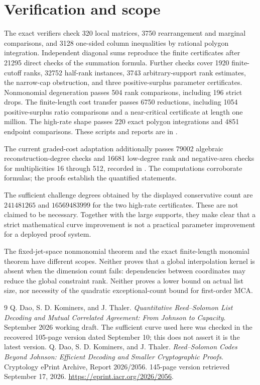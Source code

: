 \documentclass[11pt]{article}
\theoremstyle{remark}\newtheorem{remark}[theorem]{Remark}
\begin{document}
\section{Verification and scope}

The exact verifiers check 320 local matrices, 3750 rearrangement and
marginal comparisons, and 3128 one-sided column inequalities by rational
polygon integration. Independent diagonal sums reproduce the finite
certificates after 21295 direct checks of the summation formula.
Further checks cover 1920 finite-cutoff ranks, 32752 half-rank instances,
3743 arbitrary-support rank estimates, the narrow-cap obstruction,
and three positive-surplus parameter certificates. Nonmonomial
degeneration passes 504 rank comparisons, including 196 strict drops.
The finite-length cost transfer passes 6750 reductions, including 1054
positive-surplus ratio comparisons and a near-critical certificate at
length one million. The high-rate shape passes 220 exact polygon
integrations and 4851 endpoint comparisons. These scripts and reports
are in .

The current graded-cost adaptation additionally passes 79002 algebraic
reconstruction-degree checks and 16681 low-degree rank and negative-area
checks for multiplicities 16 through 512, recorded in
.
The computations corroborate formulas; the proofs establish the
quantified statements.

The sufficient challenge degrees obtained by the displayed conservative
count are $241481265$ and $16569483999$ for the two high-rate certificates.
These are not claimed to be necessary. Together with the large supports,
they make clear that a strict mathematical curve improvement is not a
practical parameter improvement for a deployed proof system.

The fixed-jet-space nonmonomial theorem and the exact finite-length
monomial theorem have different scopes. Neither proves that a global
interpolation kernel is absent when the dimension count fails:
dependencies between coordinates may reduce the global constraint rank.
Neither proves a lower bound on actual list size, nor necessity of the
quadratic exceptional-count bound for first-order MCA.

\begin{thebibliography}{9}
 Q. Dao, S. D. Kominers, and J. Thaler.
\emph{Quantitative Reed--Solomon List Decoding and Mutual Correlated
Agreement: From Johnson to Capacity}. September 2026 working draft.
The sufficient curve used here was checked in the recovered 105-page
version dated September 10; this does not assert it is the latest version.
 Q. Dao, S. D. Kominers, and J. Thaler.
\emph{Reed--Solomon Codes Beyond Johnson: Efficient Decoding and Smaller
Cryptographic Proofs}. Cryptology ePrint Archive, Report 2026/2056.
145-page version retrieved September 17, 2026.
\url{https://eprint.iacr.org/2026/2056}.
\end{thebibliography}
\end{document}
